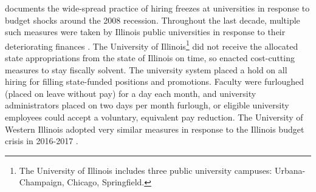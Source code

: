 \documentclass[notitlepage,12pt]{article}
\begin{document}
\cite{turner2014impact} documents the wide-spread practice of hiring freezes at universities in response to budget shocks around the 2008 recession.
Throughout the last decade, multiple such measures were taken by Illinois public universities in response to their deteriorating finances \citep{furlough2010}.
The University of Illinois\footnote{
    The University of Illinois includes three public university campuses: Urbana-Champaign, Chicago, Springfield.
}
did not receive the allocated state appropriations from the state of Illinois on time, so enacted cost-cutting measures to stay fiscally solvent.
The university system placed a hold on all hiring for filling state-funded positions and promotions.
Faculty were furloughed (placed on leave without pay) for a day each month, and university administrators placed on two days per month furlough, or eligible university employees could accept a voluntary, equivalent pay reduction.
The University of Western Illinois adopted very similar measures in response to the Illinois budget crisis in 2016-2017 \citep{wiu2016}.
\end{document}
